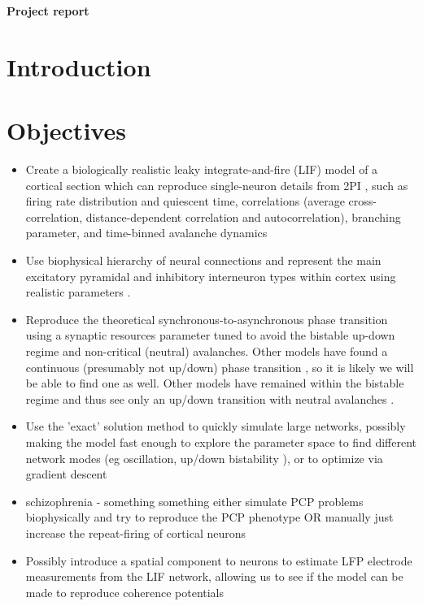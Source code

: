 \documentclass[a4paper, 12pt]{article}
\begin{document}
\noindent
\huge\textbf{Project report}
\normalsize

\section*{Introduction}

\section*{Objectives}

\begin{itemize}
\item Create a biologically realistic leaky integrate-and-fire (LIF) model of a cortical section which can reproduce single-neuron details from 2PI \cite{bellaypaper}, such as firing rate distribution and quiescent time, correlations (average cross-correlation, distance-dependent correlation and autocorrelation), branching parameter, and time-binned avalanche dynamics
  
\item Use biophysical hierarchy of neural connections \cite{rubinov} and represent the main excitatory pyramidal and inhibitory interneuron types within cortex using realistic parameters \cite{objectworkingmemory}.
  
\item Reproduce the theoretical synchronous-to-asynchronous phase transition \cite{munozlg} using a synaptic resources parameter tuned to avoid the bistable up-down regime and non-critical (neutral) avalanches. Other models have found a continuous (presumably not up/down) phase transition \cite{rubinov}, so it is likely we will be able to find one as well. Other models have remained within the bistable regime and thus see only an up/down transition with neutral avalanches \cite{neutraltheory}.
  
\item Use the 'exact' solution method \cite{exactsolution} to quickly simulate large networks, possibly making the model fast enough to explore the parameter space to find different network modes (eg oscillation, up/down bistability \cite{munozlg}), or to optimize via gradient descent
  
\item schizophrenia - something something either simulate PCP problems biophysically and try to reproduce the PCP phenotype OR manually just increase the repeat-firing of cortical neurons
  
\item Possibly introduce a spatial component to neurons to estimate LFP electrode measurements from the LIF network, allowing us to see if the model can be made to reproduce coherence potentials
\end{itemize}
\end{document}
